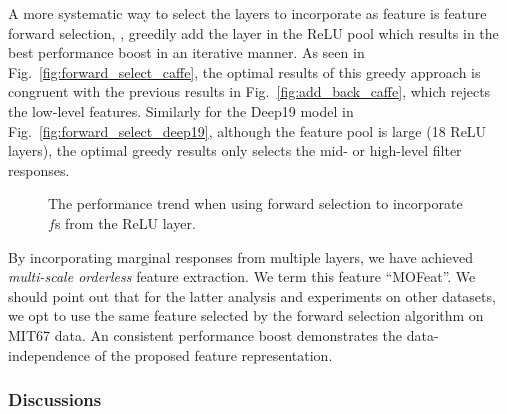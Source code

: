 \documentclass[10pt,twocolumn,letterpaper]{article}
\begin{document}
A more systematic way to select the layers to incorporate as feature is feature forward selection, \ie, greedily add the layer in the ReLU pool which results in the best performance boost in an iterative manner. As seen in Fig.~\ref{fig:forward_select_caffe}, the optimal results of this greedy approach is congruent with the previous results in Fig.~\ref{fig:add_back_caffe}, which rejects the low-level features. Similarly for the Deep19 model in Fig.~\ref{fig:forward_select_deep19}, although the feature pool is large (18 ReLU layers), the optimal greedy results only selects the mid- or high-level filter responses. 

\begin{figure}[htbp]
\centering
\caption{The performance trend when using forward selection to incorporate $f$s from the ReLU layer. }

\label{fig:forward_select}
\end{figure}

By incorporating marginal responses from multiple layers, we have achieved \textit{multi-scale orderless} feature extraction. We term this feature ``MOFeat''. We should point out that for the latter analysis and experiments on other datasets, we opt to use the same feature selected by the forward selection algorithm on MIT67 data. An consistent performance boost demonstrates the data-independence of the proposed feature representation. 

\subsubsection{Discussions}
\end{document}
